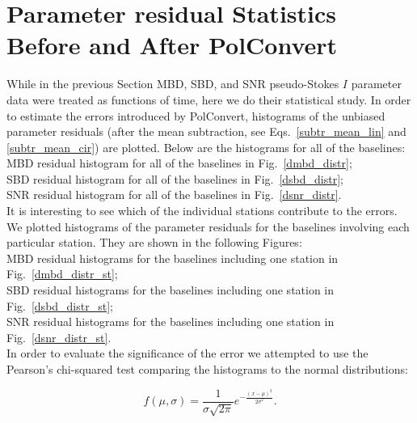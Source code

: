 \documentclass[letterpaper,twoside,12pt]{article}
\begin{document}
\section{Parameter residual Statistics Before and After PolConvert}

While in the previous Section MBD, SBD, and SNR pseudo-Stokes $I$ parameter data were treated as functions of time, here we do their statistical study. In order to estimate the errors introduced by PolConvert, histograms of the unbiased parameter residuals (after the mean subtraction, see Eqs.~\eqref{subtr_mean_lin} and \eqref{subtr_mean_cir}) are plotted. Below are the histograms for all of the baselines: \\

\indent MBD residual histogram for all of the baselines in Fig.~\ref{dmbd_distr};  \\
\indent SBD residual histogram for all of the baselines in Fig.~\ref{dsbd_distr};  \\
\indent SNR residual histogram for all of the baselines in Fig.~\ref{dsnr_distr}.  \\

It is interesting to see which of the individual stations contribute to the errors. We plotted histograms of the parameter residuals for the baselines involving each particular station. They are shown in the following Figures: \\

\indent MBD residual histograms for the baselines including one station in Fig.~\ref{dmbd_distr_st};  \\
\indent SBD residual histograms for the baselines including one station in Fig.~\ref{dsbd_distr_st};  \\
\indent SNR residual histograms for the baselines including one station in Fig.~\ref{dsnr_distr_st}.  \\

In order to evaluate the significance of the error we attempted to use the Pearson's chi-squared test comparing the histograms to the normal distributions:

\begin{equation}
  \label{normal_pdf}
  f(\mu,\sigma) =  \frac{1}{\sigma\sqrt{2\pi}} e^{-\frac{(x-\mu)^2}{2\sigma^2}}.
\end{equation}
\end{document}
